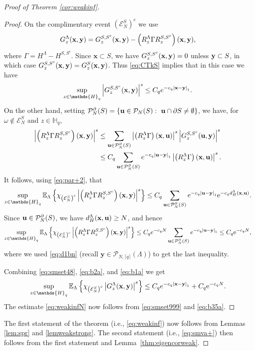 \documentclass[12pt, a4paper,reqno]{amsart}
\numberwithin{equation}{section}
\newcommand\x{\mathbf{x}}
\newcommand\y{\mathbf{y}}
\newcommand\e{\mathrm{e}}
\newcommand\E{\mathbb E}
\newcommand\cE{\mathcal{E}}
\newcommand\cP{\mathcal{P}}
\newcommand\be{\begin{equation}\begin{aligned}}
\newcommand\ee{\end{aligned}\end{equation}}
\newcommand{\abs}[1]{\left\lvert #1 \right\rvert}
\newcommand{\set}[1]{\left\{ #1 \right\}}
\newcommand{\pa}[1]{\left( #1 \right)}
\newcommand{\cl}[1]{\lceil #1 \rceil}
\newcommand\La{\Lambda}
\newcommand{\eq}[1]{\eqref{#1}}
\newcommand{\clq}{\cl{q}}
\begin{document}
\begin{proof}[Proof of  Theorem \ref{cor:weakinf}]
\begin{proof}
    
 
On the  complimentary event   $\pa{\cE_N^S}^c $ we use
\be\label{eq:smset48}
G^{\La}_{z}({\bf x},{\bf y})=G^{S,S^c}_{z}({\bf x},{\bf y})-\pa{R^{\La}_{z}\Gamma R^{S,S^c}_{z}}({\bf x},{\bf y}),
\ee
where $\Gamma=H^\La-H^{S,S^c}$. Since $\x \subset S$, we have  $G^{S,S^c}_{z}({\bf x},{\bf y})=0$ unless ${\bf y}\subset S$, in which case $G^{S,S^c}_{z}({\bf x},{\bf y})=G^{S}_{z}({\bf x},{\bf y})$. Thus \eqref{eq:CTkS} implies that in this case we have
\be\label{eq:b2a}
\sup_{z\in \mathds{H}_q} {\abs{ G^{S,S^c}_{z}({\bf x},{\bf y})}^s}\le C_q
e^{-c_q\abs{{\bf x}-{\bf y}}_1}.
\ee
On the other hand, setting $\cP_N^\partial(S) = \set{{\bf u}\in\cP_N(S): \ {\bf u}\cap \partial S\neq\emptyset}$, 
we have, for $\omega\notin \cE_N^S$ and $z\in \mathds{H}_q$, 
\be
\abs{\pa{R^{\La}_{z}\Gamma R^{S,S^c}_{z}}({\bf x},{\bf y})}^s&\le \sum_{{\bf u}\in\cP_N^\partial(S)} \abs{ \pa{R^{\La}_{z}\Gamma}({\bf x},{\bf u})}^s\abs{ G^{S,S^c}_{z}({\bf u},{\bf y})}^s\\&\le C_q \sum_{{\bf u}\in\cP_N^\partial(S)} e^{-c_q\abs{{\bf u}-{\bf y}}_1}\abs{ \pa{R^{\La}_{z}\Gamma}({\bf x},{\bf u})}^s.
\ee
It follows, using \eq{eq:par+2}, that
\be
\sup_{z\in \mathds{H}_q}\E_{\La}\set{\chi_{\pa{\cE_N^S}^c}\abs{\pa{R^{\La}_{z}\Gamma R^{S,S^c}_{z}}({\bf x},{\bf y})}^s}\le C_q \sum_{{\bf u}\in\cP_N^\partial(S)} e^{-c_q\abs{{\bf u}-{\bf y}}_1}\e^{-c_q d_H^\La ({\bf x},{\bf u})}. 
\ee
Since ${\bf u}\in\cP_N^\partial(S)$, we have $d_H^\La ({\bf x},{\bf u})\ge N$, and hence
\be\label{eq:b1a}
\sup_{z\in \mathds{H}_q}\E_{\La}\set{\chi_{\pa{\cE_N^S}^c}\abs{\pa{R^{\La}_{z}\Gamma R^{S,S^c}_{z}}({\bf x},{\bf y})}^s}\le C_q e^{-c_q N}\sum_{{\bf u}\in\cP_N^\partial(S)} e^{-c_q\abs{{\bf u}-{\bf y}}_1}\le C_q \e^{-c_q N},
\ee
where we used \eqref{eq:d1bn} 
(recall $\y \in \cP_{N,\clq}(\La)$) to get the last inequality.


Combining \eq{eq:smset48}, \eq{eq:b2a}, and \eqref{eq:b1a} we get 
\be\label{eq:b35a}
\sup_{z\in \mathds{H}_q}\E_{\La}\set{\chi_{\pa{\cE_N^S}^c} \abs{G^{\La}_{z}({\bf x},{\bf y})}^s}\le  C_q
e^{-c_q\abs{{\bf x}-{\bf y}}_1} + C_q \e^{-c_q N}.
\ee
The estimate  \eqref{eq:weakinfN}  now follows from \eq{eq:smset999}  and    \eq{eq:b35a}.
\end{proof}
The first statement of the theorem (i.e., \eq{eq:weakinf}) now follows from Lemmas \ref{lem:spr} and \ref{lemweakstrong}.  The second statement (i.e., \eq{eq:smva+}) then follows from the  first statement  and Lemma~\ref{thm:eigencorweak}.
\end{proof}
\end{document}
